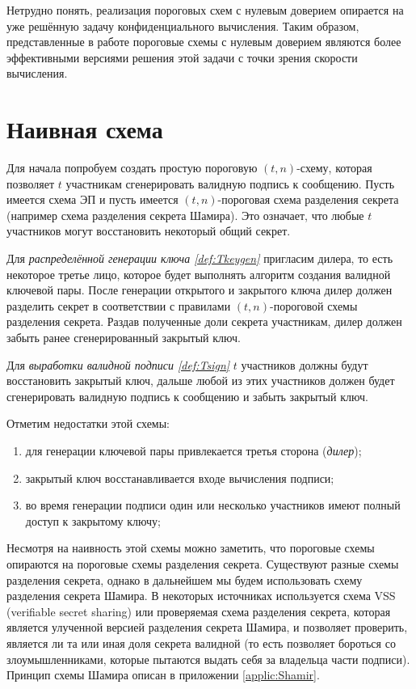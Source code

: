 \documentclass[a4paper,12pt]{article}
\theoremstyle{definition}
\begin{document}
	Нетрудно понять, реализация пороговых схем с нулевым доверием опирается на уже решённую задачу конфиденциального вычисления. Таким образом, представленные в работе пороговые схемы с нулевым доверием являются более эффективными версиями решения этой задачи с точки зрения скорости вычисления.
	
	
	\section{Наивная схема}
	
	Для начала попробуем создать простую пороговую $(t,n)$-схему, которая позволяет $t$ участникам сгенерировать валидную подпись к сообщению. Пусть имеется схема ЭП и пусть имеется $(t, n)$-пороговая схема разделения секрета (например схема разделения секрета Шамира). Это означает, что любые $t$ участников могут восстановить некоторый общий секрет.
	
	Для \textit{распределённой генерации ключа \ref{def:Tkeygen}} пригласим дилера, то есть некоторое третье лицо, которое будет выполнять алгоритм создания валидной ключевой пары. После генерации открытого и закрытого ключа дилер должен разделить секрет в соответствии с правилами $(t, n)$-пороговой схемы разделения секрета. Раздав полученные доли секрета участникам, дилер должен забыть ранее сгенерированный закрытый ключ.
	
	Для \textit{выработки валидной подписи \ref{def:Tsign}} $t$ участников должны будут восстановить закрытый ключ, дальше любой из этих участников должен будет сгенерировать валидную подпись к сообщению и забыть закрытый ключ.
	
	Отметим недостатки этой схемы: 
	\begin{enumerate}[label=\arabic*)]
		\item для генерации ключевой пары привлекается третья сторона (\textit{дилер});
		\item закрытый ключ восстанавливается входе вычисления подписи;
		\item во время генерации подписи один или несколько участников имеют полный доступ к закрытому ключу;
	\end{enumerate}

	Несмотря на наивность этой схемы можно заметить, что пороговые схемы опираются на пороговые схемы разделения секрета. Существуют разные схемы разделения секрета, однако в дальнейшем мы будем использовать схему разделения секрета Шамира. В некоторых источниках используется схема VSS (verifiable secret sharing) или проверяемая схема разделения секрета, которая является улученной версией разделения секрета Шамира, и позволяет проверить, является ли та или иная доля секрета валидной (то есть позволяет бороться со злоумышленниками, которые пытаются выдать себя за владельца части подписи). Принцип схемы Шамира описан в приложении \ref{applic:Shamir}.
	
\end{document}
